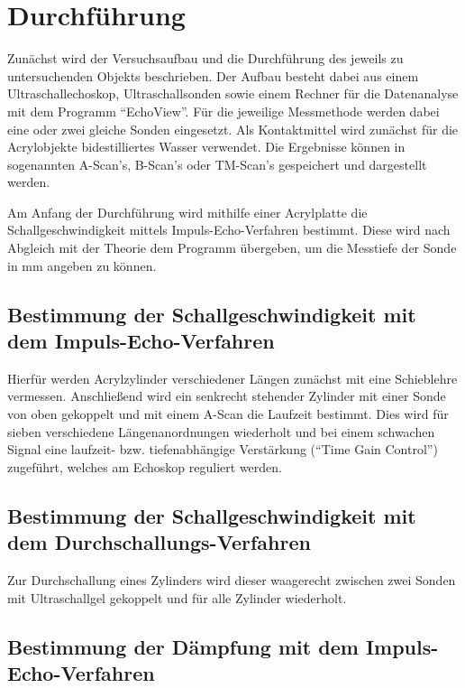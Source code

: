\section{Durchführung}
\label{sec:Durchführung}

Zunächst wird der Versuchsaufbau und die Durchführung des jeweils zu untersuchenden Objekts beschrieben.
Der Aufbau besteht dabei aus einem Ultraschallechoskop, Ultraschallsonden sowie einem Rechner für die Datenanalyse mit dem Programm \enquote{EchoView}.
Für die jeweilige Messmethode werden dabei eine oder zwei gleiche Sonden eingesetzt. 
Als Kontaktmittel wird zunächst für die Acrylobjekte bidestilliertes Wasser verwendet.
Die Ergebnisse können in sogenannten A-Scan's, B-Scan's oder TM-Scan's gespeichert und dargestellt werden.

Am Anfang der Durchführung wird mithilfe einer Acrylplatte die Schallgeschwindigkeit mittels Impuls-Echo-Verfahren bestimmt.
Diese wird nach Abgleich mit der Theorie dem Programm übergeben, um die Messtiefe der Sonde in $\unit{\milli\meter}$ angeben zu können.


\subsection{Bestimmung der Schallgeschwindigkeit mit dem Impuls-Echo-Verfahren} \label{sec:schallecho}

Hierfür werden Acrylzylinder verschiedener Längen zunächst mit eine Schieblehre vermessen. 
Anschließend wird ein senkrecht stehender Zylinder mit einer Sonde von oben gekoppelt und mit einem A-Scan die Laufzeit bestimmt.
Dies wird für sieben verschiedene Längenanordnungen wiederholt und bei einem schwachen Signal eine 
laufzeit- bzw. tiefenabhängige Verstärkung (\enquote{Time Gain Control}) zugeführt, welches am Echoskop reguliert werden.


\subsection{Bestimmung der Schallgeschwindigkeit mit dem Durchschallungs-Verfahren}

Zur Durchschallung eines Zylinders wird dieser waagerecht zwischen zwei Sonden mit Ultraschallgel gekoppelt und für alle Zylinder wiederholt.


\subsection{Bestimmung der Dämpfung mit dem Impuls-Echo-Verfahren}

